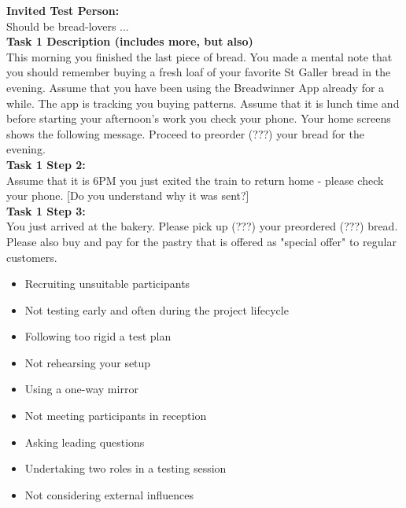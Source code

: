 \begin{breakbox}

\textbf{Invited Test Person:} \\
Should be bread-lovers ... \\
\textbf{Task 1 Description (includes more, but also)} \\
This morning you finished the last piece of bread. You 
made a mental note that you should remember buying 
a fresh loaf of your favorite St 
Galler
bread in the 
evening.
Assume that you have been using the Breadwinner 
App already for a while. The app is tracking you buying 
patterns. 
Assume that it is lunch time and before starting your 
afternoon's work you check your phone. Your home 
screens shows the following message. Proceed to 
preorder (???) your bread for the evening. \\
\textbf{Task 1 Step 2:} \\
Assume that it is 6PM you just exited the train to 
return home 
-
please check your phone. 
[Do you understand why it was sent?]  \\
\textbf{Task 1 Step 3:} \\
You just arrived at the bakery. Please pick up (???) 
your preordered (???) bread. Please also buy and pay 
for the pastry that is offered as "special offer" to regular 
customers.

\end{breakbox}

\begin{breakbox}

\begin{itemize}
\tightlist
\item
  Recruiting unsuitable participants
\item
  Not testing early and often during the project lifecycle
\item
  Following too rigid a test plan
\item
  Not rehearsing your setup
\item
  Using a one-way mirror
\item
  Not meeting participants in reception
\item
  Asking leading questions
\item
  Undertaking two roles in a testing session
\item
  Not considering external influences
\end{itemize}

\end{breakbox}


